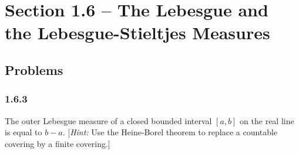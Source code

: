 \documentclass{report}
\theoremstyle{remark}
\begin{document}
\section*{Section 1.6 -- The Lebesgue and the Lebesgue-Stieltjes Measures}

\subsection*{Problems}

\subsubsection*{1.6.3}
The outer Lebesgue measure of a closed bounded interval $[a,b]$ on the real line is equal to $b-a$. [\emph{Hint:} Use the Heine-Borel theorem to replace a countable covering by a finite covering.]
\end{document}
